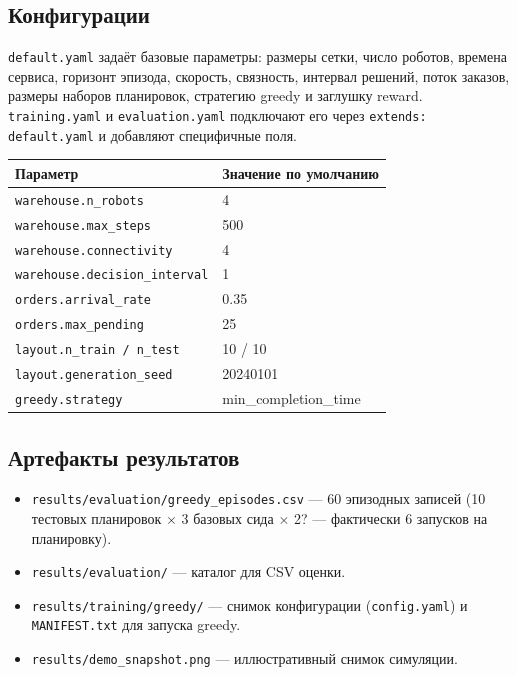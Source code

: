\documentclass[11pt,a4paper]{article}
\newcommand{\code}[1]{\texttt{#1}}
\begin{document}
\subsection{Конфигурации}
\code{default.yaml} задаёт базовые параметры: размеры сетки, число роботов,
времена сервиса, горизонт эпизода, скорость, связность, интервал решений, поток
заказов, размеры наборов планировок, стратегию greedy и заглушку reward.
\code{training.yaml} и \code{evaluation.yaml} подключают его через
\code{extends: default.yaml} и добавляют специфичные поля.

\begin{center}
\begin{tabular}{@{}ll@{}}
\toprule
\textbf{Параметр} & \textbf{Значение по умолчанию} \\
\midrule
\code{warehouse.n\_robots} & 4 \\
\code{warehouse.max\_steps} & 500 \\
\code{warehouse.connectivity} & 4 \\
\code{warehouse.decision\_interval} & 1 \\
\code{orders.arrival\_rate} & 0.35 \\
\code{orders.max\_pending} & 25 \\
\code{layout.n\_train / n\_test} & 10 / 10 \\
\code{layout.generation\_seed} & 20240101 \\
\code{greedy.strategy} & min\_completion\_time \\
\bottomrule
\end{tabular}
\end{center}

\subsection{Артефакты результатов}
\begin{itemize}[nosep]
\item \code{results/evaluation/greedy\_episodes.csv} — 60 эпизодных записей
(10 тестовых планировок $\times$ 3 базовых сида $\times$ 2? — фактически 6
запусков на планировку).
\item \code{results/evaluation/} — каталог для CSV оценки.
\item \code{results/training/greedy/} — снимок конфигурации
(\code{config.yaml}) и \code{MANIFEST.txt} для запуска greedy.
\item \code{results/demo\_snapshot.png} — иллюстративный снимок симуляции.
\end{itemize}
\end{document}
